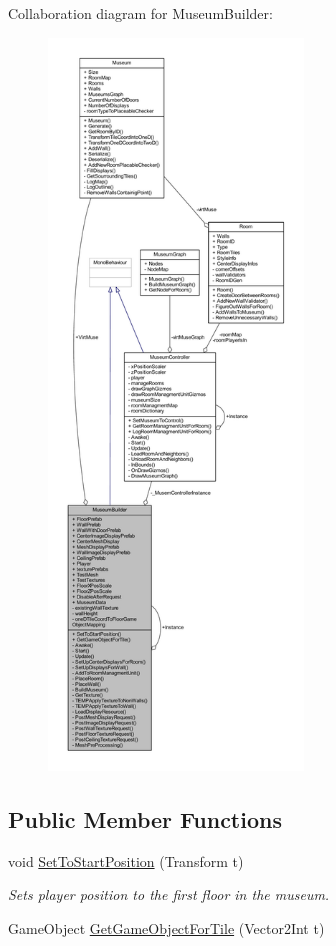 Collaboration diagram for Museum\+Builder\+:
\nopagebreak
\begin{figure}[H]
\begin{center}
\leavevmode
\includegraphics[height=550pt]{class_museum_builder__coll__graph}
\end{center}
\end{figure}
\subsection*{Public Member Functions}
\begin{DoxyCompactItemize}
\item 
void \mbox{\hyperlink{class_museum_builder_a875e7252e31ad7ae28f17eb365ef5ce5}{Set\+To\+Start\+Position}} (Transform t)
\begin{DoxyCompactList}\small\item\em Sets player position to the first floor in the museum. \end{DoxyCompactList}\item 
Game\+Object \mbox{\hyperlink{class_museum_builder_acd17822c3c2fdc7552e94dd1627586a7}{Get\+Game\+Object\+For\+Tile}} (Vector2\+Int t)
\end{DoxyCompactItemize}
